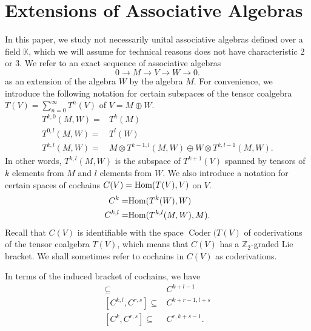 \documentclass[12pt]{amsart}
\theoremstyle{definition}
\begin{document}
\section{Extensions of Associative Algebras}\label{sec2}
In this paper, we study not necessarily unital associative algebras
defined over a field ${\mbox{$\mathbb K$}}$, which we will assume for technical
reasons does not have characteristic 2 or 3.
We refer to an exact
sequence of associative algebras
\begin{equation}
0{\rightarrow} M{\rightarrow} V{\rightarrow} W{\rightarrow} 0.
\end{equation}
as an extension of the algebra $W$ by the algebra $M$. For
convenience, we introduce the following notation for certain
subspaces of the tensor coalgebra $T(V)=\sum_{n=0}^\infty T^n(V)$ of
$V=M\oplus W$.
\begin{align*}
T^{k,0}(M,W)=&T^k(M)\\
T^{0,l}(M,W)=&T^l(W)\\
T^{k,l}(M,W)=&M{\otimes} T^{k-1,l}(M,W)\oplus W{\otimes} T^{k,l-1}(M,W).
\end{align*}
In other words, $T^{k,l}(M,W)$ is the subspace of  $T^{k+1}(V)$ spanned by
tensors of $k$ elements from $M$ and $l$ elements from $W$. We also introduce
a notation for certain spaces of cochains $C(V)={\mbox{\rm Hom}}(T(V),V)$ on $V$.
\begin{align*}
C^k=&{\mbox{\rm Hom}}(T^k(W),W)\\
C^{k,l}=&{\mbox{\rm Hom}}(T^{k,l}(M,W),M).
\end{align*}
Recall that $C(V)$ is identifiable with the space ${\operatorname{Coder}}(T(V)$ of
coderivations of
the tensor coalgebra $T(V)$, which means that $C(V)$ has a {\mbox{${\mbox{$\mathbb Z$}}_2$}}-graded
Lie bracket. We shall sometimes refer to cochains in $C(V)$ as coderivations.

In terms of the induced bracket of
cochains, we have
\begin{align*}
[C^k,C^l]\subseteq&C^{k+l-1}\\
[C^{k,l},C^{r,s}]\subseteq&C^{k+r-1,l+s}\\
[C^k,C^{r,s}]\subseteq& C^{r,k+s-1}.
\end{align*}
\end{document}
